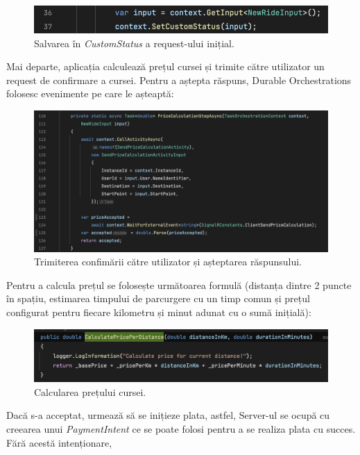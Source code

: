 \begin{figure}[H]
    \centering
    \includegraphics[width=14cm]{Assets/saveCustomStatus.png}
    \caption{Salvarea în \textit{CustomStatus} a request-ului inițial.}
    \label{fig:saveCustomStatus}
\end{figure}

Mai departe, aplicația calculează prețul cursei și trimite către utilizator un request de confirmare a cursei.
Pentru a aștepta răspuns, Durable Orchestrations folosesc evenimente pe care le așteaptă:
\begin{figure}[H]
    \centering
    \includegraphics[width=14cm]{Assets/waitForEvent.png}
    \caption{Trimiterea confimării către utilizator și așteptarea răspunsului.}
    \label{fig:waitForEvent}
\end{figure}
Pentru a calcula prețul se folosește următoarea formulă (distanța dintre 2 puncte în spațiu, estimarea timpului de
parcurgere cu un timp comun și prețul configurat pentru fiecare kilometru și minut adunat cu o sumă inițială):
\begin{figure}[H]
    \centering
    \includegraphics[width=14cm]{Assets/calculatePrice.png}
    \caption{Calcularea prețului cursei.}
    \label{fig:calculatePrice}
\end{figure}
Dacă s-a acceptat, urmează să se inițieze plata, astfel, Server-ul se ocupă cu creearea
unui \textit{PaymentIntent} ce se poate folosi pentru a se realiza plata cu succes. Fără acestă intenționare,
